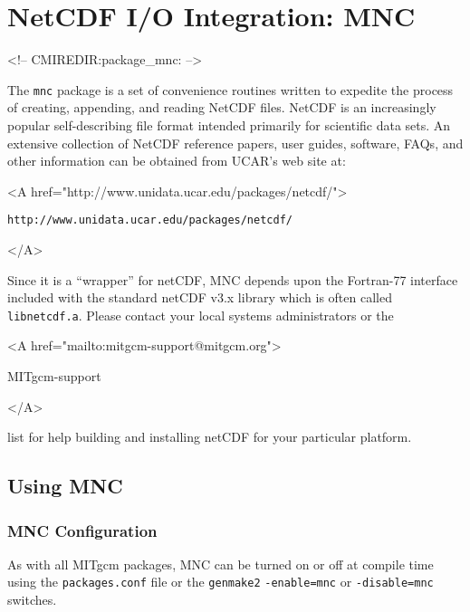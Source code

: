 
\section{NetCDF I/O Integration: MNC}
\label{sec:pkg:mnc}
\begin{rawhtml}
<!-- CMIREDIR:package_mnc: -->
\end{rawhtml}

The \texttt{mnc} package is a set of convenience routines written to
expedite the process of creating, appending, and reading NetCDF files.
NetCDF is an increasingly popular self-describing file format
\cite{rew:97} intended primarily for scientific data sets.  An
extensive collection of NetCDF reference papers, user guides,
software, FAQs, and other information can be obtained from UCAR's web
site at:
\begin{rawhtml} <A href="http://www.unidata.ucar.edu/packages/netcdf/"> \end{rawhtml}
\begin{verbatim}
http://www.unidata.ucar.edu/packages/netcdf/
\end{verbatim}
\begin{rawhtml} </A> \end{rawhtml}

Since it is a ``wrapper'' for netCDF, MNC depends upon the Fortran-77
interface included with the standard netCDF v3.x library which is
often called \texttt{libnetcdf.a}.  Please contact your local systems
administrators or the
\begin{rawhtml} <A href="mailto:mitgcm-support@mitgcm.org"> \end{rawhtml}
MITgcm-support
\begin{rawhtml} </A> \end{rawhtml}
list for help building and installing netCDF for your particular
platform.


\subsection{Using MNC}

\subsubsection{MNC Configuration}

As with all MITgcm packages, MNC can be turned on or off at compile time
using the \texttt{packages.conf} file or the \texttt{genmake2}
\texttt{-enable=mnc} or \texttt{-disable=mnc} switches.


